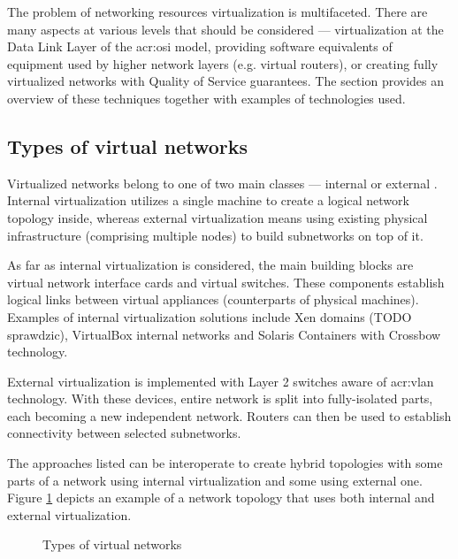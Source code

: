 \documentclass[11pt]{book}
\begin{document}
      The problem of networking resources virtualization is multifaceted. There are many aspects at various levels that
      should be considered --- virtualization at the Data Link Layer of the \gls{acr:osi} model, providing software
      equivalents of equipment used by higher network layers (e.g. virtual routers), or creating fully virtualized
      networks with Quality of Service guarantees. The section provides an overview of these techniques together with
      examples of technologies used.


      \subsection{Types of virtual networks}

        Virtualized networks belong to one of two main classes --- internal or external \cite{nsag}. Internal
        virtualization utilizes a single machine to create a logical network topology inside, whereas external
        virtualization means using existing physical infrastructure (comprising multiple nodes) to build subnetworks on
        top of it.

        As far as internal virtualization is considered, the main building blocks are virtual network interface cards
        and virtual switches. These components establish logical links between virtual appliances (counterparts of
        physical machines). Examples of internal virtualization solutions include Xen domains (TODO sprawdzic),
        VirtualBox internal networks \cite{vboxum} and Solaris Containers with Crossbow technology.

        External virtualization is implemented with Layer 2 switches aware of \gls{acr:vlan} technology. With these
        devices, entire network is split into fully-isolated parts, each becoming a new independent network. Routers can
        then be used to establish connectivity between selected subnetworks.

        The approaches listed can be interoperate to create hybrid topologies with some parts of a network using
        internal virtualization and some using external one. Figure \ref{fig:ctx:nvtypes} depicts an example of a
        network topology that uses both internal and external virtualization.
        

        \begin{figure}[H]
          \caption{Types of virtual networks}
          \label{fig:ctx:nvtypes}
        \end{figure}
\end{document}
